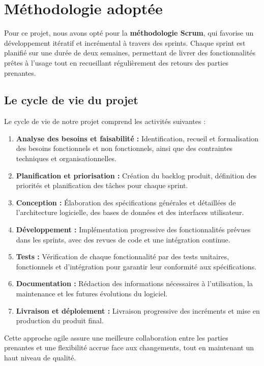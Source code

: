 \section{Méthodologie adoptée}

Pour ce projet, nous avons opté pour la \textbf{méthodologie Scrum}, qui favorise un développement itératif et incrémental à travers des sprints. Chaque sprint est planifié sur une durée de deux semaines, permettant de livrer des fonctionnalités prêtes à l'usage tout en recueillant régulièrement des retours des parties prenantes.

\subsection{Le cycle de vie du projet}

Le cycle de vie de notre projet comprend les activités suivantes :

\begin{enumerate}
    \item \textbf{Analyse des besoins et faisabilité :} Identification, recueil et formalisation des besoins fonctionnels et non fonctionnels, ainsi que des contraintes techniques et organisationnelles.
    \item \textbf{Planification et priorisation :} Création du backlog produit, définition des priorités et planification des tâches pour chaque sprint.
    \item \textbf{Conception :} Élaboration des spécifications générales et détaillées de l'architecture logicielle, des bases de données et des interfaces utilisateur.
    \item \textbf{Développement :} Implémentation progressive des fonctionnalités prévues dans les sprints, avec des revues de code et une intégration continue.
    \item \textbf{Tests :} Vérification de chaque fonctionnalité par des tests unitaires, fonctionnels et d'intégration pour garantir leur conformité aux spécifications.
    \item \textbf{Documentation :} Rédaction des informations nécessaires à l'utilisation, la maintenance et les futures évolutions du logiciel.
    \item \textbf{Livraison et déploiement :} Livraison progressive des incréments et mise en production du produit final.
\end{enumerate}

Cette approche agile assure une meilleure collaboration entre les parties prenantes et une flexibilité accrue face aux changements, tout en maintenant un haut niveau de qualité.

